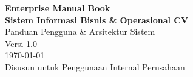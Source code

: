 ﻿\documentclass[11pt,a4paper,oneside]{book}
\begin{document}
\frontmatter

\begin{titlepage}
    \centering
    \vspace*{5cm}
    {\Huge \textbf{\color{primarycolor} Enterprise Manual Book}}\\[1.5cm]
    {\LARGE \textbf{Sistem Informasi Bisnis \& Operasional CV}}\\[2cm]
    {\Large Panduan Pengguna \& Arsitektur Sistem}\\[3cm]
    {\large Versi 1.0}\\[1cm]
    {\large \today}\\[2cm]
    \vfill
    {\large Disusun untuk Penggunaan Internal Perusahaan}
\end{titlepage}

\tableofcontents
\listoffigures
\listoftables

\mainmatter







\end{document}
